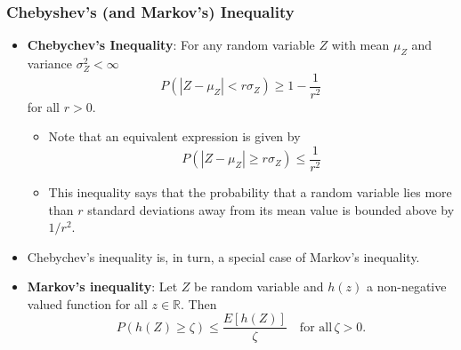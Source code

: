 \documentclass[notes=show,smaller,handout]{beamer}\usepackage[]{graphicx}\usepackage[]{color}
\renewcommand{\Pr}{P}
\newenvironment{stepitemize}{\begin{itemize}[<+->]}{\end{itemize} }
\begin{document}
\begin{frame}%

\frametitle{Chebyshev's (and Markov's) Inequality}

\begin{stepitemize}
\item \textbf{Chebychev's Inequality}: For any random variable $Z$ with mean $\mu_Z$ and variance $\sigma_Z^2<\infty$
\begin{equation*}
\Pr \left( \left\vert Z-\mu_Z\right\vert <r\sigma_Z\right) \geq 1-\frac{1 }{r^{2}}
\end{equation*}
for all $r>0$.
\begin{stepitemize}
\item Note that an equivalent expression is given by
\begin{equation}
\Pr \left( \left\vert Z-\mu_Z\right\vert \geq r\sigma_Z\right) \leq \frac{1 }{r^{2}} \label{Eq. C2}
\end{equation}
\item This inequality says that the probability that a random variable lies more than $r$ standard deviations away from its mean value is bounded above by $1/r^2$.
\end{stepitemize}
\item Chebychev's inequality is, in turn, a special case of Markov's inequality.
\item \textbf{Markov's inequality}: Let $Z$ be random variable and $h(z)$ a non-negative valued function for all $z\in \mathbb{R}$. Then
\begin{equation}
\Pr(h(Z)\geq \zeta)\leq \frac{E[h(Z)]}{\zeta}\quad\text{for all}\,\zeta>0. \label{Eq. M1}
\end{equation}
\end{stepitemize}

\end{frame}%
\end{document}
